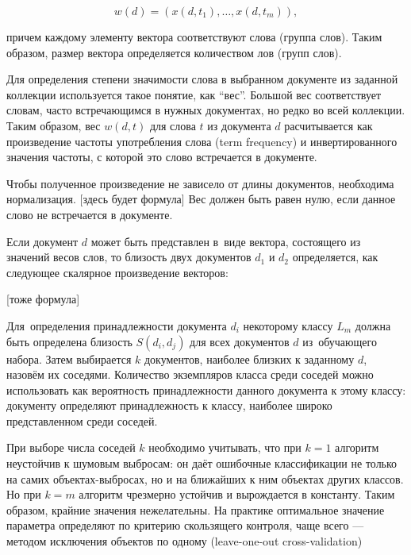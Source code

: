 $$w(d) = (x(d,t_1),\dots, x(d,t_m)),$$ 


причем каждому элементу
вектора соответствуют слова (группа слов). 
Таким образом, размер вектора определяется количеством 
лов (групп слов).

Для определения степени значимости слова в выбранном документе из заданной коллекции
используется такое понятие, как ``вес''. 
Большой вес соответствует словам, часто встречающимся 
в нужных документах, но редко во всей коллекции. 
Таким образом, вес $w(d,t)$ для слова $t$
из документа $d$ расчитывается как произведение частоты употребления слова (term frequency) %
и инвертированного значения частоты, с которой это слово встречается в документе.

Чтобы полученное произведение не зависело от длины документов, необходима нормализация.
[здесь будет формула]
Вес должен быть равен нулю, если данное слово не встречается в документе.

Если документ $d$ может быть представлен в~виде вектора, состоящего из значений весов слов, 
то близость двух документов $d_1$ и $d_2$ определяется, как следующее скалярное произведение векторов:

[тоже формула]

Для~определения принадлежности документа $d_i$ некоторому классу $L_m$ 
должна быть определена близость $S(d_i,d_j)$ для  всех документов $d$ из~обучающего набора. %
Затем выбирается $k$ документов, наиболее близких  к заданному $d$, назовём их соседями. 
Количество экземпляров класса среди соседей можно использовать как вероятность принадлежности данного документа к этому классу: 
документу определяют принадлежность к классу, наиболее широко представленном среди соседей. 

При выборе числа соседей $k$ необходимо учитывать, что при $k = 1$ алгоритм неустойчив к шумовым
выбросам: он даёт ошибочные классификации не только на самих объектах-выбросах, но и на 
ближайших к ним объектах других классов. 
Но при $k = m$ алгоритм чрезмерно устойчив и вырождается 
в константу. Таким образом, крайние значения  нежелательны. На практике оптимальное значение
параметра  определяют по критерию скользящего контроля, чаще всего — методом исключения объектов
по одному (leave-one-out cross-validation) \cite{machinelearning} %

